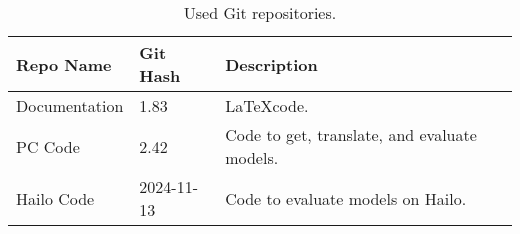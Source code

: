 \begin{table}[h!]
    \centering
    \begin{tabularx}{\textwidth}{|l|l|X|}
        \hline
        \textbf{Repo Name} & \textbf{Git Hash} & \textbf{Description}   \\ \hline
        Documentation & 1.83 & \LaTeX code. \\ \hline
        PC Code & 2.42 & Code to get, translate, and evaluate models. \\ \hline
        Hailo Code & 2024-11-13 & Code to evaluate models on Hailo. \\ \hline
    \end{tabularx}
    \caption{Used Git repositories.}
    \label{tab:git}
\end{table}

